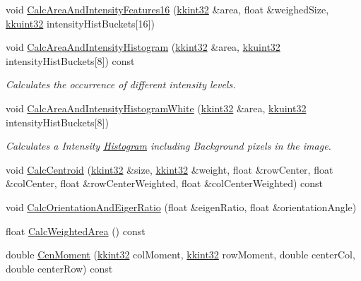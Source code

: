 \begin{DoxyCompactItemize}
void \hyperlink{class_k_k_b_1_1_raster_a3cc8283e0f535e09657a98ca642a9a7d}{Calc\+Area\+And\+Intensity\+Features16} (\hyperlink{namespace_k_k_b_a8fa4952cc84fda1de4bec1fbdd8d5b1b}{kkint32} \&area, float \&weighed\+Size, \hyperlink{namespace_k_k_b_af8d832f05c54994a1cce25bd5743e19a}{kkuint32} intensity\+Hist\+Buckets\mbox{[}16\mbox{]})
\item 
void \hyperlink{class_k_k_b_1_1_raster_ab00a913651d081e3d84eb49e18788517}{Calc\+Area\+And\+Intensity\+Histogram} (\hyperlink{namespace_k_k_b_a8fa4952cc84fda1de4bec1fbdd8d5b1b}{kkint32} \&area, \hyperlink{namespace_k_k_b_af8d832f05c54994a1cce25bd5743e19a}{kkuint32} intensity\+Hist\+Buckets\mbox{[}8\mbox{]}) const 
\begin{DoxyCompactList}\small\item\em Calculates the occurrence of different intensity levels. \end{DoxyCompactList}\item 
void \hyperlink{class_k_k_b_1_1_raster_ad6b4dbd9e1af3392dc3187e4c3378086}{Calc\+Area\+And\+Intensity\+Histogram\+White} (\hyperlink{namespace_k_k_b_a8fa4952cc84fda1de4bec1fbdd8d5b1b}{kkint32} \&area, \hyperlink{namespace_k_k_b_af8d832f05c54994a1cce25bd5743e19a}{kkuint32} intensity\+Hist\+Buckets\mbox{[}8\mbox{]})
\begin{DoxyCompactList}\small\item\em Calculates a Intensity \hyperlink{class_k_k_b_1_1_histogram}{Histogram} including Background pixels in the image. \end{DoxyCompactList}\item 
void \hyperlink{class_k_k_b_1_1_raster_a89e2ed864ff7030d55bf4c655de15636}{Calc\+Centroid} (\hyperlink{namespace_k_k_b_a8fa4952cc84fda1de4bec1fbdd8d5b1b}{kkint32} \&size, \hyperlink{namespace_k_k_b_a8fa4952cc84fda1de4bec1fbdd8d5b1b}{kkint32} \&weight, float \&row\+Center, float \&col\+Center, float \&row\+Center\+Weighted, float \&col\+Center\+Weighted) const 
\item 
void \hyperlink{class_k_k_b_1_1_raster_a29cf40b3b79c549ef3e875348f6fb053}{Calc\+Orientation\+And\+Eiger\+Ratio} (float \&eigen\+Ratio, float \&orientation\+Angle)
\item 
float \hyperlink{class_k_k_b_1_1_raster_acdaddc7e7396dd621f98d007dd59e403}{Calc\+Weighted\+Area} () const 
\item 
double \hyperlink{class_k_k_b_1_1_raster_abf23069a9a29f91def97309944d543f5}{Cen\+Moment} (\hyperlink{namespace_k_k_b_a8fa4952cc84fda1de4bec1fbdd8d5b1b}{kkint32} col\+Moment, \hyperlink{namespace_k_k_b_a8fa4952cc84fda1de4bec1fbdd8d5b1b}{kkint32} row\+Moment, double center\+Col, double center\+Row) const 

\end{DoxyCompactItemize}
